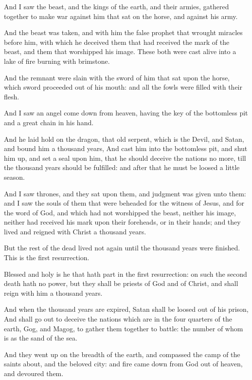\Verse And I saw the beast, and the kings of the earth, and their armies, gathered together to make war against him that sat on the horse, and against his army.

\Verse And the beast was taken, and with him the false prophet that wrought miracles before him, with which he deceived them that had received the mark of the beast, and them that worshipped his image.  These both were cast alive into a lake of fire burning with brimstone.

\Verse And the remnant were slain with the sword of him that sat upon the horse, which sword proceeded out of his mouth: and all the fowls were filled with their flesh.

\Chapter
\Verse And I saw an angel come down from heaven, having the key of the bottomless pit and a great chain in his hand.

\Verse And he laid hold on the dragon, that old serpent, which is the Devil, and Satan, and bound him a thousand years, \Verse And cast him into the bottomless pit, and shut him up, and set a seal upon him, that he should deceive the nations no more, till the thousand years should be fulfilled: and after that he must be loosed a little season.

\Verse And I saw thrones, and they sat upon them, and judgment was given unto them: and I saw the souls of them that were beheaded for the witness of Jesus, and for the word of God, and which had not worshipped the beast, neither his image, neither had received his mark upon their foreheads, or in their hands; and they lived and reigned with Christ a thousand years.

\Verse But the rest of the dead lived not again until the thousand years were finished. This is the first resurrection.

\Verse Blessed and holy is he that hath part in the first resurrection: on such the second death hath no power, but they shall be priests of God and of Christ, and shall reign with him a thousand years.

\Verse And when the thousand years are expired, Satan shall be loosed out of his prison, \Verse And shall go out to deceive the nations which are in the four quarters of the earth, Gog, and Magog, to gather them together to battle: the number of whom is as the sand of the sea.

\Verse And they went up on the breadth of the earth, and compassed the camp of the saints about, and the beloved city: and fire came down from God out of heaven, and devoured them.

